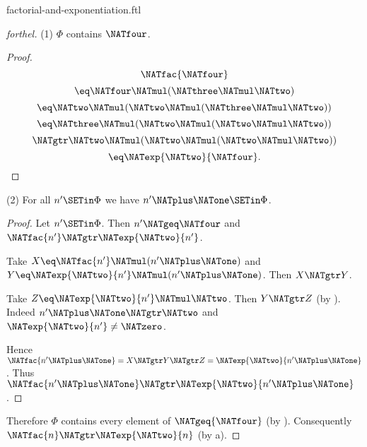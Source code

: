 \documentclass{naproche-library}
\begin{document}
\begin{smodule}[title=Factorial and Exponentiation]{factorial-and-exponentiation.ftl}
\begin{proof}[forthel]
  (1) $\Phi$ contains $\NATfour$.
  \begin{proof}
    \[  \NATfac{\NATfour}                                  \]
    \[    \eq \NATfour \NATmul (\NATthree \NATmul \NATtwo)             \]
    \[    \eq \NATtwo \NATmul (\NATtwo \NATmul (\NATthree \NATmul \NATtwo))   \]
    \[    \eq \NATthree \NATmul (\NATtwo \NATmul (\NATtwo \NATmul \NATtwo))   \]
    \[    \NATgtr \NATtwo \NATmul (\NATtwo \NATmul (\NATtwo \NATmul \NATtwo))   \]
    \[    \eq \NATexp{\NATtwo}{\NATfour}.                          \]
  \end{proof}

  (2) For all $n' \SETin \Phi$ we have $n' \NATplus \NATone \SETin \Phi$.
  \begin{proof}
    Let $n' \SETin \Phi$.
    Then $n' \NATgeq \NATfour$ and $\NATfac{n'} \NATgtr \NATexp{\NATtwo}{n'}$.

    Take $X \eq \NATfac{n'} \NATmul (n' \NATplus \NATone)$ and $Y \eq \NATexp{\NATtwo}{n'} \NATmul (n' \NATplus \NATone)$.
    Then $X \NATgtr Y$.

    Take $Z \eq \NATexp{\NATtwo}{n'} \NATmul \NATtwo$.
    Then $Y \NATgtr Z$ (by ).
    Indeed $n' \NATplus \NATone \NATgtr \NATtwo$ and $\NATexp{\NATtwo}{n'} \neq \NATzero$.

    Hence $\NATfac{n' \NATplus \NATone} = X \NATgtr Y \NATgtr Z = \NATexp{\NATtwo}{n' \NATplus \NATone}$.
    Thus $\NATfac{n' \NATplus \NATone} \NATgtr \NATexp{\NATtwo}{n' \NATplus \NATone}$.
  \end{proof}

  Therefore $\Phi$ contains every element of $\NATgeq{\NATfour}$ (by ).
  Consequently $\NATfac{n} \NATgtr \NATexp{\NATtwo}{n}$ (by a).
\end{proof}
\end{smodule}
\end{document}
